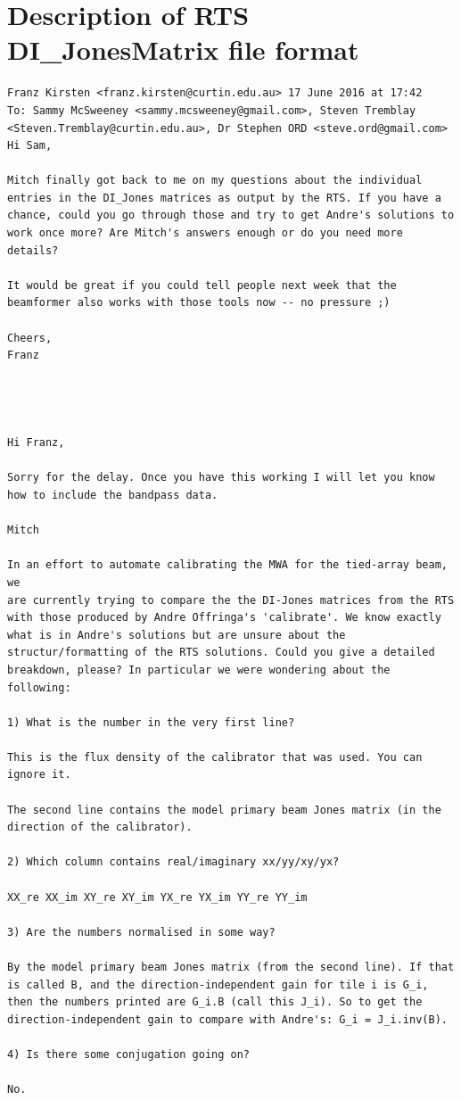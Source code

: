 \documentclass{book}
\begin{document}
\appendix

\chapter{Description of RTS DI\_JonesMatrix file format}

\begin{lstlisting}
Franz Kirsten <franz.kirsten@curtin.edu.au>	17 June 2016 at 17:42
To: Sammy McSweeney <sammy.mcsweeney@gmail.com>, Steven Tremblay <Steven.Tremblay@curtin.edu.au>, Dr Stephen ORD <steve.ord@gmail.com>
Hi Sam,

Mitch finally got back to me on my questions about the individual entries in the DI_Jones matrices as output by the RTS. If you have a chance, could you go through those and try to get Andre's solutions to work once more? Are Mitch's answers enough or do you need more details?

It would be great if you could tell people next week that the beamformer also works with those tools now -- no pressure ;)

Cheers,
Franz




Hi Franz,

Sorry for the delay. Once you have this working I will let you know how to include the bandpass data.

Mitch

In an effort to automate calibrating the MWA for the tied-array beam, we
are currently trying to compare the the DI-Jones matrices from the RTS
with those produced by Andre Offringa's 'calibrate'. We know exactly
what is in Andre's solutions but are unsure about the
structur/formatting of the RTS solutions. Could you give a detailed
breakdown, please? In particular we were wondering about the following:

1) What is the number in the very first line?

This is the flux density of the calibrator that was used. You can ignore it.

The second line contains the model primary beam Jones matrix (in the direction of the calibrator).

2) Which column contains real/imaginary xx/yy/xy/yx?

XX_re XX_im XY_re XY_im YX_re YX_im YY_re YY_im

3) Are the numbers normalised in some way?

By the model primary beam Jones matrix (from the second line). If that is called B, and the direction-independent gain for tile i is G_i, then the numbers printed are G_i.B (call this J_i). So to get the direction-independent gain to compare with Andre's: G_i = J_i.inv(B).

4) Is there some conjugation going on?

No.
\end{lstlisting}
\end{document}

